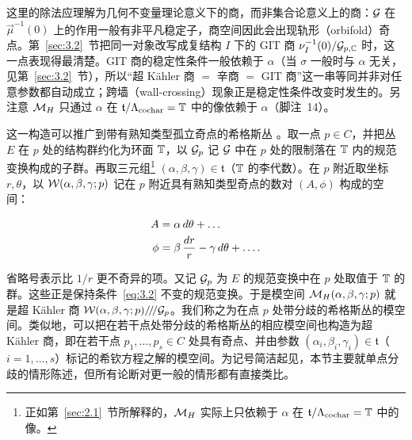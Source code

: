 \begin{yizhu}[易错点]
这里的除法应理解为几何不变量理论意义下的商，而非集合论意义上的商：$\mathcal{G}$ 在 $\vec\mu^{-1}(0)$ 上的作用一般有非平凡稳定子，商空间因此会出现轨形（orbifold）奇点。第~\ref{sec:3.2}~节把同一对象改写成复结构 $I$ 下的 GIT 商 $\nu_I^{-1}(0)/\mathcal{G}_{p,{\mathbb{C}}}$ 时，这一点表现得最清楚。GIT 商的稳定性条件一般依赖于 $\alpha$（当 $\sigma$ 一般时与 $\alpha$ 无关，见第~\ref{sec:3.2}~节），所以“超 Kähler 商 $=$ 辛商 $=$ GIT 商”这一串等同并非对任意参数都自动成立；跨墙（wall-crossing）现象正是稳定性条件改变时发生的。另注意 ${{\mathcal{M}}_H}$ 只通过 $\alpha$ 在 $\mathfrak t/\Lambda_{{\rm cochar}}={\mathbb{T}}$ 中的像依赖于 $\alpha$（脚注~14）。
\end{yizhu}

这一构造可以推广到带有熟知类型孤立奇点的希格斯丛 \cite{ref23,ref24}。取一点 $p\in C$，并把丛 $E$ 在 $p $ 处的结构群约化为环面 ${\mathbb{T}}$，以 $\mathcal{G}_p$ 记 $\mathcal{G}$ 中在 $p$ 处的限制落在 ${\mathbb{T}}$ 内的规范变换构成的子群。再取三元组\footnote{正如第~\ref{sec:2.1}~节所解释的，${{\mathcal{M}}_H}$ 实际上只依赖于 $\alpha$ 在 $\mathfrak t/\Lambda_{{\rm cochar}}={\mathbb{T}}$ 中的像。}
$(\alpha,\beta,\gamma)\in \mathfrak t$（${\mathbb{T}}$ 的李代数）。在 $p$ 附近取坐标 $r,\theta$，以 $\mathcal{W}(\alpha,\beta,\gamma;p)$ 记在 $p$ 附近具有熟知类型奇点的数对 $(A,\phi)$ 构成的空间：

\setcounter{equation}{1}
\begin{equation}\label{eq:3.2}
  \begin{aligned}A & =\alpha\,d\theta+\dots\\
 \phi & = \beta\,{dr\over r}-\gamma\,d\theta+\dots.\end{aligned}
\end{equation}

省略号表示比 $1/r$ 更不奇异的项。又记 $\mathcal{G}_p$ 为 $E$ 的规范变换中在 $p$ 处取值于 ${\mathbb{T}}$ 的群。这些正是保持条件~\eqref{eq:3.2} 不变的规范变换。于是模空间 ${\mathcal{M}}_H(\alpha,\beta,\gamma;p)$ 就是超 Kähler 商
$\mathcal{W}(\alpha,\beta,\gamma;p)/\negthinspace/\negthinspace/\mathcal{G}_p$。我们称之为在点 $p$ 处带分歧的希格斯丛的模空间。类似地，可以把在若干点处带分歧的希格斯丛的相应模空间也构造为超 Kähler 商，即在若干点 $p_1,\dots,p_s\in C$ 处具有奇点、并由参数 $(\alpha_i,\beta_i,\gamma_i)\in \mathfrak t$（$i=1,\dots,s$）标记的希钦方程之解的模空间。为记号简洁起见，本节主要就单点分歧的情形陈述，但所有论断对更一般的情形都有直接类比。

